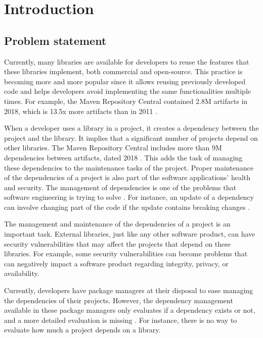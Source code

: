 \chapter{Introduction}\label{ch:Introduction}

\section{Problem statement}
Currently, many libraries are available for developers to reuse the features that these libraries implement, both commercial and open-source. This practice is becoming more and more popular since it allows reusing previously developed code and helps developers avoid implementing the same functionalities multiple times. For example, the Maven Repository Central contained 2.8M artifacts in 2018, which is 13.5x more artifacts than in 2011  \cite{Benelallam2019}.

When a developer uses a library in a project, it creates a dependency between the project and the library. It implies that a significant number of projects depend on other libraries. The Maven Repository Central includes more than 9M dependencies between artifacts, dated 2018 \cite{Benelallam2019}. This adds the task of managing these dependencies to the maintenance tasks of the project. Proper maintenance of the dependencies of a project is also part of the software applications' health and security. The management of dependencies is one of the problems that software engineering is trying to solve \cite{kula2014visualizing}. For instance, an update of a dependency can involve changing part of the code if the update contains breaking changes \cite{Raemaekers2017}.

The management and maintenance of the dependencies of a project is an important task. External libraries, just like any other software product, can have security vulnerabilities that may affect the projects that depend on these libraries. For example, some security vulnerabilities can become problems that can negatively impact a software product regarding integrity, privacy, or availability.

\blankl
Currently, developers have package managers at their disposal to ease managing the dependencies of their projects. However, the dependency management available in these package managers only evaluates if a dependency exists or not, and a more detailed evaluation is missing \cite{hejderup2018prazi}. For instance, there is no way to evaluate how much a project depends on a library.

